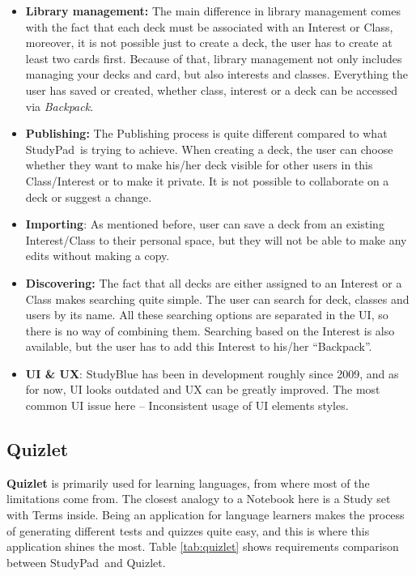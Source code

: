 \documentclass[thesis=B,english]{FITthesis}[2012/10/20]
\newcommand{\appname}{StudyPad}
\begin{document}
\begin{itemize}
	\item \textbf{Library management:} The main difference in library management comes with the fact that each deck must be associated with an Interest or Class, moreover, it is not possible just to create a deck, the user has to create at least two cards first. Because of that, library management not only includes managing your decks and card, but also interests and classes. Everything the user has saved or created, whether class, interest or a deck can be accessed via \textit{Backpack}.
	\item \textbf{Publishing:} The Publishing process is quite different compared  to what \appname\ is trying to achieve. When creating a deck, the user can choose whether they want to make his/her deck visible for other users in this Class/Interest or to make it private. It is not possible to collaborate on a deck or suggest a change.
	
	\item \textbf{Importing}: As mentioned before, user can save a deck from an existing Interest/Class to their personal space, but they will not be able to make any edits without making a copy.
	\item \textbf{Discovering:} The fact that all decks are either assigned to an Interest or a Class makes searching quite simple. The user can search for deck, classes and users by its name. All these searching options are separated in the UI, so there is no way of combining them. Searching based on the Interest is also available, but the user has to add this Interest to his/her \enquote{Backpack}.
	\item \textbf{UI \&  UX}: StudyBlue has been in development roughly since 2009, and as for now, UI looks outdated and UX can be greatly improved. The most common UI issue here -- Inconsistent usage of UI elements styles.
\end{itemize}

 \subsection{Quizlet}
\textbf{Quizlet} is primarily used for learning languages, from where most of the limitations come from. The closest analogy to a Notebook here is a Study set with Terms inside. Being an application for language learners makes the process of generating different tests and quizzes quite easy, and this is where this application shines the most. Table \ref{tab:quizlet} shows requirements comparison between \appname\ and Quizlet.
\end{document}
